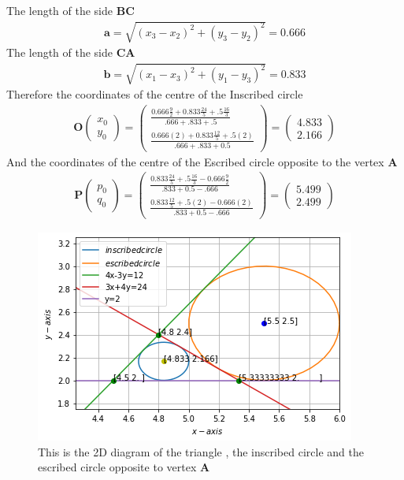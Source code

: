 \documentclass[journal,12pt,twocolumn]{IEEEtran}
\newcommand{\myvec}[1]{\ensuremath{\begin{pmatrix}#1\end{pmatrix}}}
\numberwithin{equation}{subsection}
\let\vec\mathbf
\begin{document}
 The length of the side $\vec{BC}$
 \begin{align}
 \vec{a}=\sqrt{(x_3-x_2)^2+(y_3-y_2)^2}=0.666
 \end{align}
  The length of the side $\vec{CA}$ 
 \begin{align}
\vec{b}=\sqrt{(x_1-x_3)^2+(y_1-y_3)^2}=0.833
 \end{align}
Therefore the coordinates of the centre of the Inscribed circle
 \begin{align}
 \vec{O}\myvec{x_0 \\y_0}=\myvec{\frac{0.666\frac{9}{2}+ 0.833\frac{24}{5}+.5\frac{16}{3}}{.666+.833+.5}\\ \frac{0.666(2)+ 0.833\frac{12}{5}+.5(2)}{.666+.833+0.5}}={\myvec{4.833\\2.166}}
 \end{align} 
And the coordinates of the centre of the Escribed circle  opposite to the vertex $\vec{A}$
 \begin{align}
\vec{P}\myvec{p_0 \\q_0}=\myvec{\frac{0.833\frac{24}{5}+.5\frac{16}{3}-0.666\frac{9}{2}}{.833+0.5-.666}\\ \frac{0.833\frac{12}{5}+.5(2)-0.666(2)}{.833+0.5-.666}}={\myvec{5.499\\2.499}}
 \end{align}

\begin{figure}[!]
 \begin{center}
  \includegraphics[width=\columnwidth]{assignment4/assignment4.png}
    \caption{This is the 2D diagram of the triangle , the inscribed circle and the escribed circle opposite to vertex $\vec{A}$}
    \label{myfig:1}
    \end{center}
\end{figure}
\end{document}
